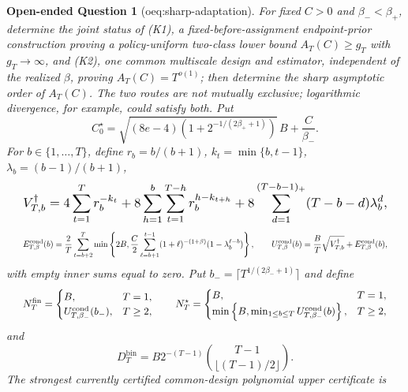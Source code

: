 \documentclass{article}
\newtheorem{openendedquestion}{Open-ended Question}
\begin{document}
\begin{openendedquestion}[oeq:sharp-adaptation]\label{oeq:sharp-adaptation}
For fixed \(C>0\) and \(\beta_-<\beta_+\), determine the joint status of (K1), a fixed-before-assignment endpoint-prior construction proving a policy-uniform two-class lower bound \(A_T(C)\ge g_T\) with \(g_T\to\infty\), and (K2), one common multiscale design and estimator, independent of the realized \(\beta\), proving \(A_T(C)=T^{o(1)}\); then determine the sharp asymptotic order of \(A_T(C)\). The two routes are not mutually exclusive; logarithmic divergence, for example, could satisfy both. Put \[C_0^\star=\sqrt{(8e-4)\left(1+2^{-1/(2\beta_++1)}\right)}\,B+\frac C{\beta_-}.\] For \(b\in\{1,\ldots,T\}\), define \(r_b=b/(b+1)\), \(k_t=\min\{b,t-1\}\), \(\lambda_b=(b-1)/(b+1)\), \[
\makebox[\linewidth][c]{\resizebox{0.98\linewidth}{!}{\leavevmode\par\noindent \makebox[\linewidth][c]{\resizebox{0.98\linewidth}{!}{\(\displaystyle \displaystyle V_{T,b}^{\dagger}=4\sum_{t=1}^T r_b^{-k_t}+8\sum_{h=1}^b\sum_{t=1}^{T-h}r_b^{h-k_{t+h}}+8\sum_{d=1}^{(T-b-1)_+}(T-b-d)\lambda_b^d,\)}}\par\noindent}}
\] \[
\makebox[\linewidth][c]{\resizebox{0.98\linewidth}{!}{\leavevmode\par\noindent \makebox[\linewidth][c]{\resizebox{0.98\linewidth}{!}{\(\displaystyle \displaystyle E_{T,\beta}^{\mathrm{cond}}(b)=\frac2T\sum_{t=b+2}^T\min\left\{2B,\frac C2\sum_{\ell=b+1}^{t-1}(1+\ell)^{-(1+\beta)}(1-\lambda_b^{\ell-b})\right\},\qquad U_{T,\beta}^{\mathrm{cond}}(b)=\frac BT\sqrt{V_{T,b}^{\dagger}}+E_{T,\beta}^{\mathrm{cond}}(b),\)}}\par\noindent}}
\] with empty inner sums equal to zero. Put \(b_-=\lceil T^{1/(2\beta_-+1)}\rceil\) and define \[
\makebox[\linewidth][c]{\resizebox{0.98\linewidth}{!}{\leavevmode\par\noindent \makebox[\linewidth][c]{\resizebox{0.98\linewidth}{!}{\(\displaystyle \displaystyle N_T^{\mathrm{fin}}=\begin{cases}B,&T=1,\\ U_{T,\beta_-}^{\mathrm{cond}}(b_-),&T\ge2,\end{cases}\qquad N_T^\star=\begin{cases}B,&T=1,\\ \min\left\{B,\min_{1\le b\le T}U_{T,\beta_-}^{\mathrm{cond}}(b)\right\},&T\ge2,\end{cases}\)}}\par\noindent}}
\] and \[D_T^{\mathrm{bin}}=B2^{-(T-1)}\binom{T-1}{\lfloor(T-1)/2\rfloor}.\] The strongest currently certified common-design polynomial upper certificate is \[
\]
\end{openendedquestion}
\end{document}
